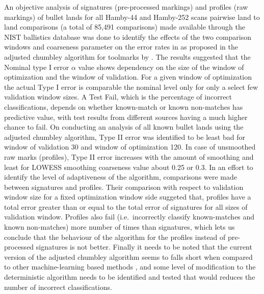 \documentclass[12pt]{article}
\begin{document}
An objective analysis of signatures (pre-processed markings) and
profiles (raw markings) of bullet lands for all Hamby-44 and Hamby-252
scans pairwise land to land comparisons (a total of 85,491
comparisons)\citep{hamby} made available through the NIST ballistics
database \citep{nist} was done to identify the effects of the two
comparison windows and coarseness parameter on the error rates in as
proposed in the adjusted chumbley algorithm for toolmarks by
\citet{hadler}. The results suggested that the Nominal type I error
\(\alpha\) value shows dependency on the size of the window of
optimization and the window of validation. For a given window of
optimization the actual Type I error is comparable the nominal level
only for only a select few validation window sizes. A Test Fail, which
is the percentage of incorrect classifications, depends on whether
known-match or known non-matches has predictive value, with test results
from different sources having a much higher chance to fail. On
conducting an analysis of all known bullet lands using the adjusted
chumbley algorithm, Type II error was identified to be least bad for
window of validation 30 and window of optimization 120. In case of
unsmoothed raw marks (profiles), Type II error increases with the amount
of smoothing and least for LOWESS smoothing coarseness value about 0.25
or 0.3. In an effort to identify the level of adaptiveness of the
algorithm, comparisons were made between signatures and profiles. Their
comparison with respect to validation window size for a fixed
optimization window side suggeted that, profiles have a total error
greater than or equal to the total error of signatures for all sizes of
validation window. Profiles also fail (i.e.~incorrectly classify
known-matches and known non-matches) more number of times than
signatures, which lets us conclude that the behaviour of the algorithm
for the profiles instead of pre-processed signatures is not better.
Finally it needs to be noted that the current version of the adjusted
chumbley algorithm seems to falls short when compared to other
machine-learning based methods \citet{aoas}, and some level of
modification to the deterministic algorithm needs to be identified and
tested that would reduces the number of incorrect classifications.



\end{document}
